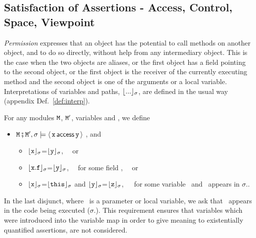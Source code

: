 \subsection{Satisfaction of Assertions - Access, Control, Space, Viewpoint}
\label{sect:pcsv} 

\textit{Permission} expresses that an object has the potential to call
methods on another object, and to do so directly, without  help from any
intermediary object. This is the case when the two objects are aliases, 
or the first object has a field pointing to the second object, or
the first object is the receiver of the currently executing method and the second object is one of the 
arguments or a local variable. Interpretations of variables and paths, ${\lfloor{ {...}}\rfloor_{\sigma}}$, are defined
in the usual way (appendix Def.~\ref{def:interp}).


\begin{definition}[%
Permission]  \label{def:valid:assertion:access}
For any modules ${\mbox{\tt{\ensuremath{{\mbox{\tt{M}}}}}}}$, ${\mbox{\tt{\ensuremath{{\mbox{\tt{M}}}}}}}'$,  variables  and , we define
\begin{itemize}
\item
${\mbox{\tt{\ensuremath{{\mbox{\tt{M}}}}}}}\fatsemi {\mbox{\tt{\ensuremath{{\mbox{\tt{M}}}}}}}', \sigma \models  \langle\, {\mbox{\tt{x}}}\, \mathsf{access}\, {\mbox{\tt{y}}}\, \rangle$   \IFF  {}, and \begin{itemize}
\item
${\lfloor{ {{\mbox{\tt{x}}}}}\rfloor_{\sigma}}$=${\lfloor{ {{\mbox{\tt{y}}}}}\rfloor_{\sigma}}$, \ \ or
\item
${\lfloor{ {{\mbox{\tt{x}}}.{\mbox{\tt{f}}}}}\rfloor_{\sigma}}$=${\lfloor{ {{\mbox{\tt{y}}}}}\rfloor_{\sigma}}$, \  \ for some field ,  \ \ or
\item
${\lfloor{ {{\mbox{\tt{x}}}}}\rfloor_{\sigma}}$=${\lfloor{ {{\mbox{\tt{this}}}}}\rfloor_{\sigma}}$ and
  ${\lfloor{ {{\mbox{\tt{y}}}}}\rfloor_{\sigma}}$=${\lfloor{ {{{\mbox{\tt{z}}}}}}\rfloor_{\sigma}}$,\ \ \ 
for some variable \z\ and  \z\ appears in  $\sigma$..
 \end{itemize}
\end{itemize}
\end{definition}

\noindent 
In the last disjunct, where \z\ is a parameter or local variable,
we  ask that   \z\ appears in the code being executed ($\sigma$.).
This requirement %
ensures that variables which were introduced into the variable map 
in order to give meaning to existentially quantified assertions, are not considered.


